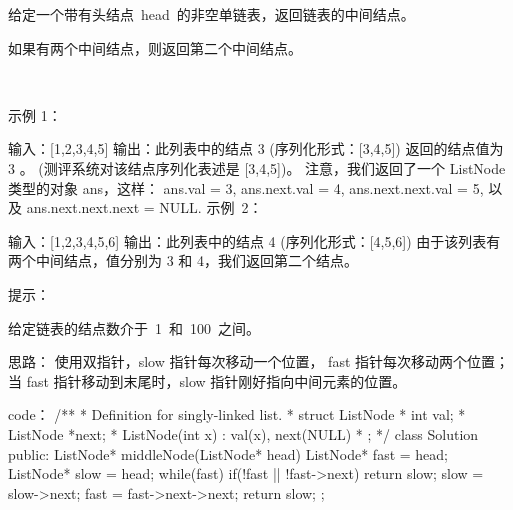 给定一个带有头结点 head 的非空单链表，返回链表的中间结点。

如果有两个中间结点，则返回第二个中间结点。

 

示例 1：

输入：[1,2,3,4,5]
输出：此列表中的结点 3 (序列化形式：[3,4,5])
返回的结点值为 3 。 (测评系统对该结点序列化表述是 [3,4,5])。
注意，我们返回了一个 ListNode 类型的对象 ans，这样：
ans.val = 3, ans.next.val = 4, ans.next.next.val = 5, 以及 ans.next.next.next = NULL.
示例 2：

输入：[1,2,3,4,5,6]
输出：此列表中的结点 4 (序列化形式：[4,5,6])
由于该列表有两个中间结点，值分别为 3 和 4，我们返回第二个结点。
 

提示：

给定链表的结点数介于 1 和 100 之间。



























思路：
使用双指针，slow 指针每次移动一个位置， fast 指针每次移动两个位置；当 fast 指针移动到末尾时，slow 指针刚好指向中间元素的位置。



























code：
/**
 * Definition for singly-linked list.
 * struct ListNode {
 *     int val;
 *     ListNode *next;
 *     ListNode(int x) : val(x), next(NULL) {}
 * };
 */
class Solution {
public:
    ListNode* middleNode(ListNode* head) {
        ListNode* fast = head;
        ListNode* slow = head;
        while(fast)
        {
            if(!fast || !fast->next) return slow;
            slow = slow->next;
            fast = fast->next->next;
        }
        return slow;
    }
};